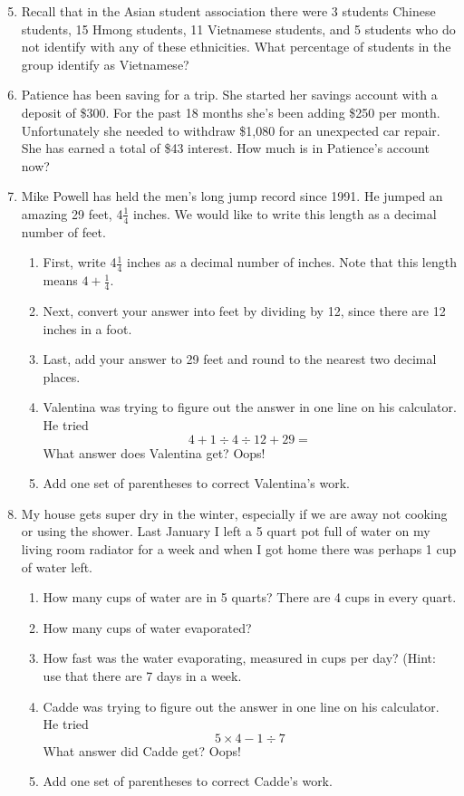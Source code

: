 \begin{enumerate} 
\setcounter{enumi}{4}

\item Recall that in the Asian student association there were 3 students Chinese students, 15 Hmong students, 11 Vietnamese students, and 5 students who do not identify with any of these ethnicities. What percentage of students in the group identify as Vietnamese?

\item Patience has been saving for a trip. She started her savings account with a deposit of \$300.  For the past 18 months she's been adding \$250 per month. Unfortunately she needed to withdraw \$1,080 for an unexpected car repair.  She has earned a total of \$43 interest.  How much is in Patience's account now?

\item Mike Powell has held the men's long jump record since 1991.  He jumped an amazing 29 feet, 4$\frac{1}{4}$ inches.  We would like to write this length as a decimal number of feet.
\begin{enumerate}
\item First, write 4$\frac{1}{4}$ inches as a decimal number of inches.  Note that this length means $4 + \frac{1}{4}$.
\item Next, convert your answer into feet by dividing by 12, since there are 12 inches in a foot.
\item Last, add your answer to 29 feet and round to the nearest two decimal places.
\item Valentina was trying to figure out the answer in one line on his calculator. He tried $$4 + 1 \div 4 \div 12+29=$$
What answer does Valentina get? Oops!
\item Add one set of parentheses to correct Valentina's work.
\end{enumerate}

\item My house gets super dry in the winter, especially if we are away not cooking or using the shower.  Last January I left a 5 quart pot full of water on my living room radiator for a week and when I got home there was perhaps 1 cup of water left.  
\begin{enumerate}
\item How many cups of water are in 5 quarts? There are 4 cups in every quart.
\item How many cups of water evaporated?
\item How fast was the water evaporating, measured in cups per day? (Hint: use that there are 7 days in a week.
\item Cadde was trying to figure out the answer in one line on his calculator.  He tried $$5 \times 4 -1 \div 7$$
What answer did Cadde get?  Oops!
\item Add one set of parentheses to correct Cadde's work.
\end{enumerate}





\end{enumerate}

